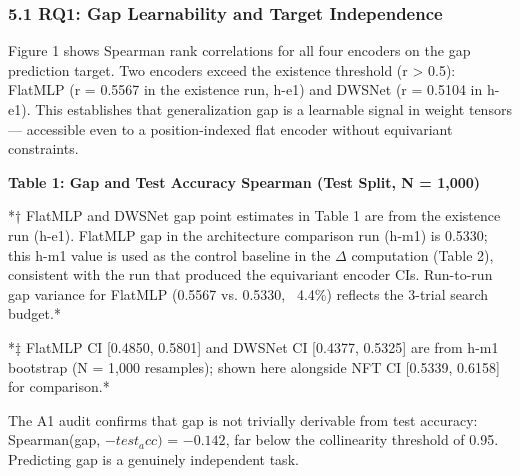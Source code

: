 
\subsubsection{5.1 RQ1: Gap Learnability and Target Independence}

Figure 1 shows Spearman rank correlations for all four encoders on the gap prediction target. Two encoders
exceed the existence threshold (r > 0.5): FlatMLP (r = 0.5567 in the existence run, h-e1) and DWSNet
(r = 0.5104 in h-e1). This establishes that generalization gap is a learnable signal in weight tensors
--- accessible even to a position-indexed flat encoder without equivariant constraints.

\textbf{Table 1: Gap and Test Accuracy Spearman (Test Split, N = 1,000)}

\begin{table}[htbp]
\centering
{}
\end{table}

*† FlatMLP and DWSNet gap point estimates in Table 1 are from the existence run (h-e1). FlatMLP gap in
the architecture comparison run (h-m1) is 0.5330; this h-m1 value is used as the control baseline in the
$\Delta$ computation (Table 2), consistent with the run that produced the equivariant encoder CIs. Run-to-run
gap variance for FlatMLP (0.5567 vs. 0.5330, ~4.4\%) reflects the 3-trial search budget.*

*‡ FlatMLP CI [0.4850, 0.5801] and DWSNet CI [0.4377, 0.5325] are from h-m1 bootstrap (N = 1,000
resamples); shown here alongside NFT CI [0.5339, 0.6158] for comparison.*

The A1 audit confirms that gap is not trivially derivable from test accuracy: Spearman(gap, $-test_acc)$
= $-0.142$, far below the collinearity threshold of 0.95. Predicting gap is a genuinely independent task.

